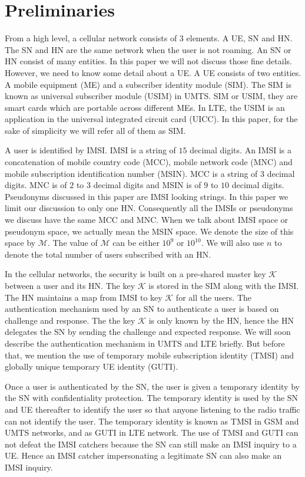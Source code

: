 \documentclass{llncs} %
\begin{document}
\section{Preliminaries}
From a high level, a cellular network consists of $3$ elements. A UE, SN and HN. The SN and HN are the same network when the user is not roaming. An SN or HN consist of many entities. In this paper we will not discuss those fine details. However, we need to know some detail about a UE. A UE consists of two entities. A mobile equipment (ME) and a subscriber identity module (SIM). The SIM is known as universal subscriber module (USIM) in UMTS. SIM or USIM, they are smart cards which are portable across different MEs. In LTE, the USIM is an application in the universal integrated circuit card (UICC). In this paper, for the sake of simplicity we will refer all of them as SIM.


A user is identified by IMSI. IMSI is a string of $15$ decimal digits. An IMSI is a concatenation of mobile country code (MCC), mobile network code (MNC) and mobile subscription identification number (MSIN). MCC is a string of $3$ decimal digits. MNC is of $2$ to $3$ decimal digits and MSIN is of $9$ to $10$ decimal digits. Pseudonyms discussed in this paper are IMSI looking strings. In this paper we limit our discussion to only one HN. Consequently all the IMSIs or pseudonyms we discuss have the same MCC and MNC. When we talk about IMSI space or pseudonym space, we actually mean the MSIN space. We denote the size of this space by $\mathcal{M}$. The value of $\mathcal{M}$ can be either $10^9$ or $10^{10}$. We will also use $n$ to denote the total number of users subscribed with an HN.

In the cellular networks, the security is built on a pre-shared master key $\mathcal{K}$ between a user and its HN. The key $\mathcal{K}$ is stored in the SIM along with the IMSI. The HN maintains a map from IMSI to key $\mathcal{K}$ for all the users. The authentication mechanism used by an SN to authenticate a user is based on challenge and response. The the key $\mathcal{K}$ is only known by the HN, hence the HN delegates the SN by sending the challenge and expected response. We will soon describe the authentication mechanism in UMTS and LTE briefly. But before that, we mention the use of temporary mobile subscription identity (TMSI) and globally unique temporary UE identity (GUTI).

Once a user is authenticated by the SN, the user is given a temporary identity by the SN with confidentiality protection. The temporary identity is used by the SN and UE thereafter to identify the user so that anyone listening to the radio traffic can not identify the user. The temporary identity is known as TMSI in GSM and UMTS networks, and as GUTI in LTE network. The use of TMSI and GUTI can not defeat the IMSI catchers because the SN can still make an IMSI inquiry to a UE. Hence an IMSI catcher impersonating a legitimate SN can also make an IMSI inquiry. 
\end{document}
